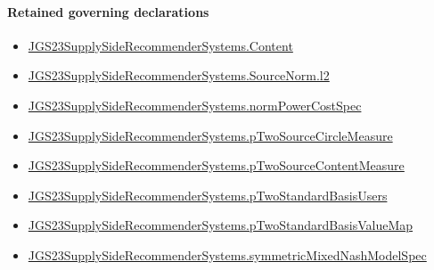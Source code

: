 \documentclass[10pt]{article}
\begin{document}
\paragraph{Retained governing declarations}
\begin{itemize}\raggedright
\item \hyperlink{governing-declaration-367305fda50f0ada}{JGS23\allowbreak{}Supply\allowbreak{}Side\allowbreak{}Recommender\allowbreak{}Systems.\allowbreak{}Content}
\item \hyperlink{governing-declaration-9299663ffe3ecb38}{JGS23\allowbreak{}Supply\allowbreak{}Side\allowbreak{}Recommender\allowbreak{}Systems.\allowbreak{}Source\allowbreak{}Norm.\allowbreak{}l2}
\item \hyperlink{governing-declaration-6ba13dc1cae95e6e}{JGS23\allowbreak{}Supply\allowbreak{}Side\allowbreak{}Recommender\allowbreak{}Systems.\allowbreak{}norm\allowbreak{}Power\allowbreak{}Cost\allowbreak{}Spec}
\item \hyperlink{governing-declaration-cd2eb0bec05b9fee}{JGS23\allowbreak{}Supply\allowbreak{}Side\allowbreak{}Recommender\allowbreak{}Systems.\allowbreak{}p\allowbreak{}Two\allowbreak{}Source\allowbreak{}Circle\allowbreak{}Measure}
\item \hyperlink{governing-declaration-fc211c75589fb22a}{JGS23\allowbreak{}Supply\allowbreak{}Side\allowbreak{}Recommender\allowbreak{}Systems.\allowbreak{}p\allowbreak{}Two\allowbreak{}Source\allowbreak{}Content\allowbreak{}Measure}
\item \hyperlink{governing-declaration-b00b3d57e66564ea}{JGS23\allowbreak{}Supply\allowbreak{}Side\allowbreak{}Recommender\allowbreak{}Systems.\allowbreak{}p\allowbreak{}Two\allowbreak{}Standard\allowbreak{}Basis\allowbreak{}Users}
\item \hyperlink{governing-declaration-c13a6748f5c431e4}{JGS23\allowbreak{}Supply\allowbreak{}Side\allowbreak{}Recommender\allowbreak{}Systems.\allowbreak{}p\allowbreak{}Two\allowbreak{}Standard\allowbreak{}Basis\allowbreak{}Value\allowbreak{}Map}
\item \hyperlink{paper-prerequisite-b412efba7deb757f}{JGS23\allowbreak{}Supply\allowbreak{}Side\allowbreak{}Recommender\allowbreak{}Systems.\allowbreak{}symmetric\allowbreak{}Mixed\allowbreak{}Nash\allowbreak{}Model\allowbreak{}Spec}
\end{itemize}
\end{document}
